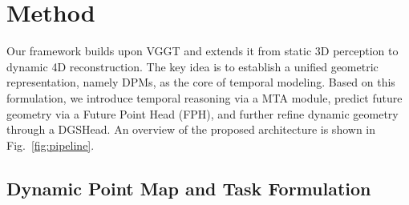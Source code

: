 \section{Method}

Our framework builds upon VGGT and extends it from static 3D perception to dynamic 4D reconstruction. 
The key idea is to establish a unified geometric representation, namely DPMs, as the core of temporal modeling. 
Based on this formulation, we introduce temporal reasoning via a MTA module, predict future geometry via a Future Point Head (FPH), and further refine dynamic geometry through a DGSHead. 
An overview of the proposed architecture is shown in Fig.~\ref{fig:pipeline}.

\subsection{Dynamic Point Map and Task Formulation}



